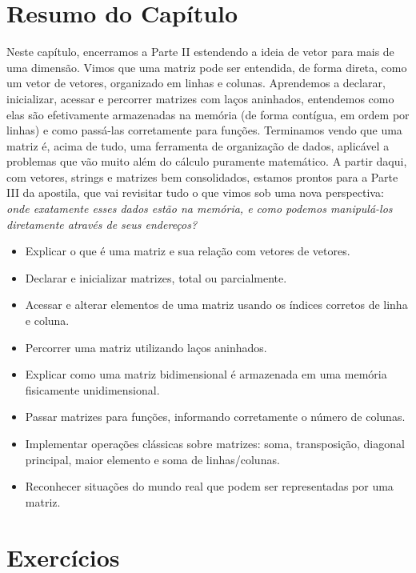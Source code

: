 \section*{Resumo do Capítulo}
Neste capítulo, encerramos a Parte II estendendo a ideia de vetor para mais de uma dimensão. Vimos que uma matriz pode ser entendida, de forma direta, como um vetor de vetores, organizado em linhas e colunas. Aprendemos a declarar, inicializar, acessar e percorrer matrizes com laços aninhados, entendemos como elas são efetivamente armazenadas na memória (de forma contígua, em ordem por linhas) e como passá-las corretamente para funções. Terminamos vendo que uma matriz é, acima de tudo, uma ferramenta de organização de dados, aplicável a problemas que vão muito além do cálculo puramente matemático. A partir daqui, com vetores, strings e matrizes bem consolidados, estamos prontos para a Parte III da apostila, que vai revisitar tudo o que vimos sob uma nova perspectiva: \textit{onde exatamente esses dados estão na memória, e como podemos manipulá-los diretamente através de seus endereços?}

\begin{objetivos}
\begin{itemize}
    \item Explicar o que é uma matriz e sua relação com vetores de vetores.
    \item Declarar e inicializar matrizes, total ou parcialmente.
    \item Acessar e alterar elementos de uma matriz usando os índices corretos de linha e coluna.
    \item Percorrer uma matriz utilizando laços aninhados.
    \item Explicar como uma matriz bidimensional é armazenada em uma memória fisicamente unidimensional.
    \item Passar matrizes para funções, informando corretamente o número de colunas.
    \item Implementar operações clássicas sobre matrizes: soma, transposição, diagonal principal, maior elemento e soma de linhas/colunas.
    \item Reconhecer situações do mundo real que podem ser representadas por uma matriz.
\end{itemize}
\end{objetivos}

\section*{Exercícios}

